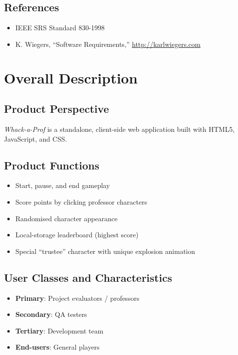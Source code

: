\documentclass[11pt]{scrreprt}
\newcommand*{\product}{\textit{Whack-a-Prof}\xspace}
\begin{document}
\section{References}
\begin{itemize}
  \item IEEE SRS Standard 830-1998
  \item K. Wiegers, “Software Requirements,” \url{http://karlwiegers.com}
\end{itemize}

\chapter{Overall Description}

\section{Product Perspective}
\product is a standalone, client-side web application built with HTML5, JavaScript, and CSS.

\section{Product Functions}
\begin{itemize}
  \item Start, pause, and end gameplay
  \item Score points by clicking professor characters
  \item Randomised character appearance
  \item Local-storage leaderboard (highest score)
  \item Special “trustee” character with unique explosion animation
\end{itemize}

\section{User Classes and Characteristics}
\begin{itemize}
  \item \textbf{Primary}: Project evaluators / professors
  \item \textbf{Secondary}: QA testers
  \item \textbf{Tertiary}: Development team
  \item \textbf{End-users}: General players
\end{itemize}
\end{document}
